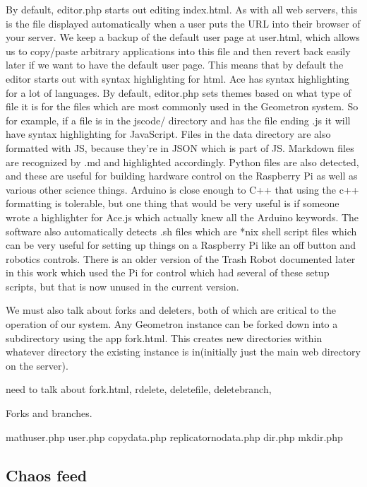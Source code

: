 By default, editor.php starts out editing index.html.  As with all web servers, this is the file displayed automatically when a user puts the URL into their browser of your server.  We keep a backup of the default user page at user.html, which allows us to copy/paste arbitrary applications into this file and then revert back easily later if we want to have the default user page.  This means that by default the editor starts out with syntax highlighting for html.  Ace has syntax highlighting for a lot of languages.  By default, editor.php sets themes based on what type of file it is for the files which are most commonly used in the Geometron system.  So for example, if a file is in the jscode/ directory and has the file ending .js it will have syntax highlighting for JavaScript.  Files in the data directory are also formatted with JS, because they're in JSON which is part of JS.  Markdown files are recognized by .md and highlighted accordingly.  Python files are also detected, and these are useful for building hardware control on the Raspberry Pi as well as various other science things.  Arduino is close enough to C++ that using the c++ formatting is tolerable, but one thing that would be very useful is if someone wrote a highlighter for Ace.js which actually knew all the Arduino keywords. The software also automatically detects .sh files which are *nix shell script files which can be very useful for setting up things on a Raspberry Pi like an off button and robotics controls.  There is an older version of the Trash Robot documented later in this work which used the Pi for control which had several of these setup scripts, but that is now unused in the current version.

We must also talk about forks and deleters, both of which are critical to the operation of our system.  Any Geometron instance can be forked down into a subdirectory using the app fork.html.  This creates new directories within whatever directory the existing instance is in(initially just the main web directory on the server).



need to talk about fork.html, rdelete, deletefile, deletebranch,

Forks and branches.

mathuser.php
user.php
copydata.php
replicatornodata.php
dir.php
mkdir.php

\subsection{Chaos feed}

